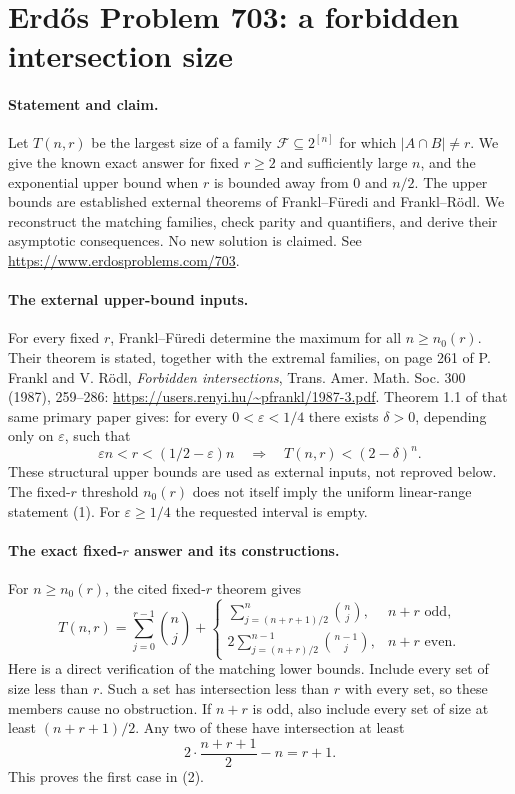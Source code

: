 \section*{Erd\H{o}s Problem 703: a forbidden intersection size}

\paragraph{Statement and claim.}
Let \(T(n,r)\) be the largest size of a family
\(\mathcal F\subseteq2^{[n]}\) for which \(|A\cap B|\ne r\).
We give the known exact answer for fixed \(r\geq2\) and
sufficiently large \(n\), and the exponential upper bound
when \(r\) is bounded away from \(0\) and \(n/2\).
The upper bounds are established external theorems of
Frankl--F\"uredi and Frankl--R\"odl. We reconstruct the matching
families, check parity and quantifiers, and derive their
asymptotic consequences. No new solution is claimed.
See \url{https://www.erdosproblems.com/703}.

\paragraph{The external upper-bound inputs.}
For every fixed \(r\), Frankl--F\"uredi determine the maximum
for all \(n\geq n_0(r)\). Their theorem is stated, together
with the extremal families, on page 261 of
P. Frankl and V. R\"odl, \emph{Forbidden intersections},
Trans. Amer. Math. Soc. 300 (1987), 259--286:
\url{https://users.renyi.hu/~pfrankl/1987-3.pdf}.
Theorem 1.1 of that same primary paper gives: for every
\(0<\varepsilon<1/4\) there exists \(\delta>0\), depending
only on \(\varepsilon\), such that
\[
 \varepsilon n<r<(1/2-\varepsilon)n
 \quad\Longrightarrow\quad
 T(n,r)<(2-\delta)^n.                                          \tag{1}
\]
These structural upper bounds are used as external inputs,
not reproved below. The fixed-\(r\) threshold \(n_0(r)\) does
not itself imply the uniform linear-range statement (1).
For \(\varepsilon\geq1/4\) the requested interval is empty.

\paragraph{The exact fixed-\(r\) answer and its constructions.}
For \(n\geq n_0(r)\), the cited fixed-\(r\) theorem gives
\[
 T(n,r)=\sum_{j=0}^{r-1}\binom nj+
 \begin{cases}
 \displaystyle\sum_{j=(n+r+1)/2}^{n}\binom nj,&n+r\text{ odd},\\[6pt]
 \displaystyle2\sum_{j=(n+r)/2}^{n-1}\binom{n-1}j,&n+r\text{ even}.
 \end{cases}                                                   \tag{2}
\]
Here is a direct verification of the matching lower bounds.
Include every set of size less than \(r\).
Such a set has intersection less than \(r\) with every set,
so these members cause no obstruction.
If \(n+r\) is odd, also include every set of size at least
\((n+r+1)/2\). Any two of these have intersection at least
\[
 2\cdot\frac{n+r+1}{2}-n=r+1.
\]
This proves the first case in (2).

